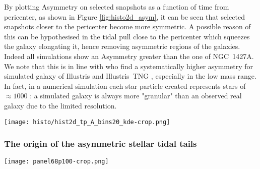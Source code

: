 By plotting Asymmetry on selected snapshots as a function of time from pericenter, as shown in Figure \ref{fig:histo2d_asym}, it can be seen that selected snapshots closer to the pericenter become more symmetric.
A possible reason of this can be hypothesised in the tidal pull close to the pericenter which squeezes the galaxy elongating it, hence removing asymmetric regions of the galaxies.
Indeed all simulations show an Asymmetry greater than the one of NGC~1427A. We note that this is in line with \citet{Rodriguez-Gomez2019} who find a systematically higher asymmetry for simulated galaxy of Illustris and Illustris~TNG \citep{Vogelsberger2014, Pillepich2018}, especially in the low mass range.
In fact, in a numerical simulation each star particle created represents stars of $\approx 1000$ \Msun{}: a simulated galaxy is always more "granular" than an observed real galaxy due to the limited resolution.

\begin{figure*}
\centering
\texttt{[image: histo/hist2d\_tp\_A\_bins20\_kde-crop.png]}
\caption{2D histogram of selected oriented snapshots with tolerance $\delta=20$~deg.
The distribution is plotted with time from first pericenter passage on the $x$ axis, whereas on the $y$ axis the \emph{Asymmetry} non-parametric measure as defined by \citet{Lotz2004}.
Each column corresponds to a different isophote used to compute the stellar tidal orientation.
We overplot a kernel density estimation of the distribution for the snapshots approaching pericenter. The dotted red line corresponds to the measured \emph{Asymmetry} for NGC~1427A.}
\label{fig:histo2d_asym}
\end{figure*}



\subsubsection{The origin of the asymmetric stellar tidal tails}
\begin{sidewaysfigure}
\centering
\texttt{[image: panel68p100-crop.png]}
\caption{Evolution in time of the simulation with ID 68 around first pericenter passage, projected in a way that the first column has $r_p = 137$~kpc, $v_p = 693$~km/s, the target values for NGC~1427A.
All the other snapshots are seen from the same point of view as the first one.
Black arrow indicates the direction to the cluster center whereas the green indicates the instantaneous velocity direction of the galaxy projected on the plane of the sky. In the first column, an ellipse fitted on the $26.5$ mag/arcsec$^2$ is shown to highlight the direction of the tidal elongation.
The first row represents the surface brightness of snapshots around the first pericenter. \Hi{} Contours are [$10^{17}, 10^{18}, 10^{19}, 10^{20}, 10^{21}$]~amu~cm$^{-2}$.
Second row the $g'$-$r'$ colour.
Third and fourth row the v-band SPH-average age and velocity of star particles along the line of sight.}
\label{fig:panel}
\end{sidewaysfigure}

